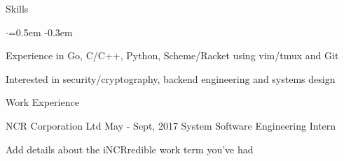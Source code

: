 \documentclass{resume} %
\begin{document}

\begin{rSection}{Skills}
  \vspace {0.3em}
  \begin{list}{$\cdot$}{\leftmargin=0.5em}
    \itemsep -0.3em \vspace{-0.3em}
    \item Experience in Go, C/C++, Python, Scheme/Racket using vim/tmux and Git
    \item Interested in security/cryptography, backend engineering and systems design
  \end{list}
  \vspace{0.3em}
\end{rSection}



\begin{rSection}{Work Experience}
  \begin{rSubsection}{NCR Corporation Ltd}
		     {May - Sept, 2017}
		     {System Software Engineering Intern}
		     {}
    \item Add details about the iNCRredible work term you've had
  \end{rSubsection}
\end{rSection} 
\end{document}
